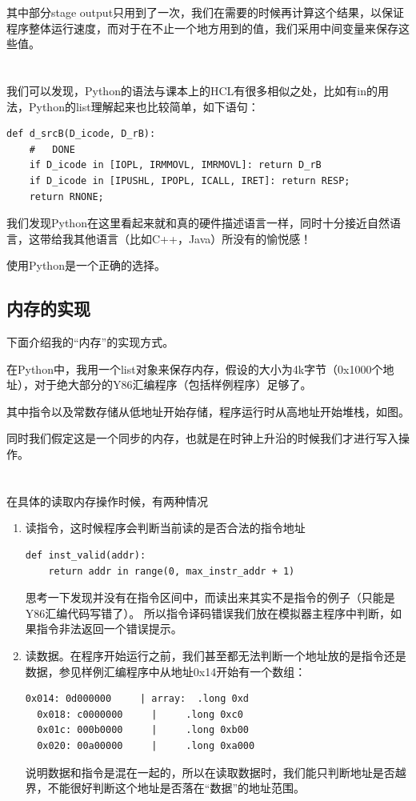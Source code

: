 \documentclass{article}
\begin{document}
其中部分stage output只用到了一次，我们在需要的时候再计算这个结果，以保证程序整体运行速度，而对于在不止一个地方用到的值，我们采用中间变量来保存这些值。
\\
\\
\\
\indent 我们可以发现，Python的语法与课本上的HCL有很多相似之处，比如有in的用法，Python的list理解起来也比较简单，如下语句：
\begin{lstlisting}[frame=single]
def d_srcB(D_icode, D_rB):
    #   DONE
    if D_icode in [IOPL, IRMMOVL, IMRMOVL]: return D_rB
    if D_icode in [IPUSHL, IPOPL, ICALL, IRET]: return RESP;
    return RNONE;
\end{lstlisting}

我们发现Python在这里看起来就和真的硬件描述语言一样，同时十分接近自然语言，这带给我其他语言（比如C++，Java）所没有的愉悦感！

使用Python是一个正确的选择。

\subsection{内存的实现}
下面介绍我的“内存”的实现方式。

在Python中，我用一个list对象来保存内存，假设的大小为4k字节（0x1000个地址），对于绝大部分的Y86汇编程序（包括样例程序）足够了。

其中指令以及常数存储从低地址开始存储，程序运行时从高地址开始堆栈，如图。

同时我们假定这是一个同步的内存，也就是在时钟上升沿的时候我们才进行写入操作。
\\
\\
\\
\indent 在具体的读取内存操作时候，有两种情况
\begin{enumerate}
\item 读指令，这时候程序会判断当前读的是否合法的指令地址
\begin{lstlisting}[frame=single]
def inst_valid(addr):
	return addr in range(0, max_instr_addr + 1)
\end{lstlisting}
思考一下发现并没有在指令区间中，而读出来其实不是指令的例子（只能是Y86汇编代码写错了）。
所以指令译码错误我们放在模拟器主程序中判断，如果指令非法返回一个错误提示。

\item 读数据。在程序开始运行之前，我们甚至都无法判断一个地址放的是指令还是数据，参见样例汇编程序中从地址0x14开始有一个数组：
\begin{lstlisting}[frame=single]
  0x014: 0d000000     | array:	.long 0xd
  0x018: c0000000     | 	.long 0xc0
  0x01c: 000b0000     | 	.long 0xb00
  0x020: 00a00000     | 	.long 0xa000
\end{lstlisting}

说明数据和指令是混在一起的，所以在读取数据时，我们能只判断地址是否越界，不能很好判断这个地址是否落在“数据”的地址范围。
\end{enumerate}
\end{document}
